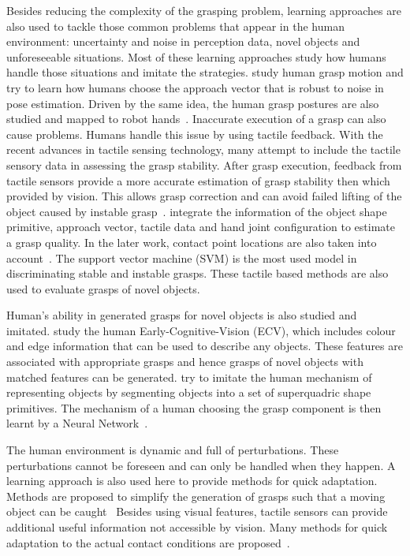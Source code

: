 Besides reducing the complexity of the grasping problem, learning approaches are also used to tackle those common problems that appear in the human environment: uncertainty and noise in perception data, novel objects and unforeseeable situations. Most of these learning approaches study how humans handle those situations and imitate the strategies. \citet{ekvall2007learning,stulp2011learning} study human grasp motion and try to learn how humans choose the approach vector that is robust to noise in pose estimation. Driven by the same idea, the human grasp postures are also studied and mapped to robot hands~\citep{tegin2009demonstration}. Inaccurate execution of a grasp can also cause problems. Humans handle this issue by using tactile feedback.
With the recent advances in tactile sensing technology, many attempt to include the tactile sensory data in assessing the grasp stability.
After grasp execution, feedback from tactile sensors provide a more accurate estimation of grasp stability then which provided by vision. This allows grasp correction and can avoid failed lifting of the object caused by instable grasp~\citep{li2014learning}.
\citet{bekiroglu2011assessing} integrate the information of the object shape primitive, approach vector, tactile data and hand joint configuration to estimate a grasp quality.
In the later work, contact point locations are also taken into account~\citep{dang2012learning,dang2014stable}. The support vector machine (SVM) is the most used model in discriminating stable and instable grasps. These tactile based methods are also used to evaluate grasps of novel objects.

Human's ability in generated grasps for novel objects is also studied and imitated.
\citet{detry2009learning} study the human Early-Cognitive-Vision (ECV), which includes colour and edge information that can be used to describe any objects. These features are associated with appropriate grasps and hence grasps of novel objects with matched features can be generated.
\citet{el2007learning} try to imitate the human mechanism of representing objects by segmenting objects into a set of superquadric shape primitives. The mechanism of a human choosing the grasp component is then learnt by a Neural Network~\citep{el2010new}.



The human environment is dynamic and full of perturbations. These perturbations cannot be foreseen and can only be handled when they happen. A learning approach is also used here to provide methods for quick adaptation. Methods are proposed to simplify the generation of grasps such that a moving object can be caught~\citep{harada2008fast,kim2012,bidan2013grasp}
Besides using visual features, tactile sensors can provide additional useful information not accessible by vision. Many methods for quick adaptation to the actual contact conditions are proposed~\citep{hsiao2010contact,hsiao2011robust,kazemi2012robust,sauser2011iterative,li2014learning}.




